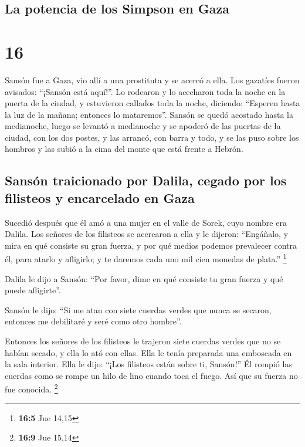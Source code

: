 \hypertarget{la-potencia-de-los-simpson-en-gaza}{%
\subsection{La potencia de los Simpson en
Gaza}\label{la-potencia-de-los-simpson-en-gaza}}

\hypertarget{section-15}{%
\section{16}\label{section-15}}

 Sansón fue a Gaza, vio allí a una prostituta y se acercó
a ella.  Los gazatíes fueron avisados: ``¡Sansón está
aquí!''. Lo rodearon y lo acecharon toda la noche en la puerta de la
ciudad, y estuvieron callados toda la noche, diciendo: ``Esperen hasta
la luz de la mañana; entonces lo mataremos''.  Sansón se
quedó acostado hasta la medianoche, luego se levantó a medianoche y se
apoderó de las puertas de la ciudad, con los dos postes, y las arrancó,
con barra y todo, y se las puso sobre los hombros y las subió a la cima
del monte que está frente a Hebrón.

\hypertarget{sansuxf3n-traicionado-por-dalila-cegado-por-los-filisteos-y-encarcelado-en-gaza}{%
\subsection{Sansón traicionado por Dalila, cegado por los filisteos y
encarcelado en
Gaza}\label{sansuxf3n-traicionado-por-dalila-cegado-por-los-filisteos-y-encarcelado-en-gaza}}

 Sucedió después que él amó a una mujer en el valle de
Sorek, cuyo nombre era Dalila.  Los señores de los
filisteos se acercaron a ella y le dijeron: ``Engáñalo, y mira en qué
consiste su gran fuerza, y por qué medios podemos prevalecer contra él,
para atarlo y afligirlo; y te daremos cada uno mil cien monedas de
plata.'' \footnote{\textbf{16:5} Jue 14,15}

 Dalila le dijo a Sansón: ``Por favor, dime en qué
consiste tu gran fuerza y qué puede afligirte''.

 Sansón le dijo: ``Si me atan con siete cuerdas verdes que
nunca se secaron, entonces me debilitaré y seré como otro hombre''.

 Entonces los señores de los filisteos le trajeron siete
cuerdas verdes que no se habían secado, y ella lo ató con ellas.
 Ella le tenía preparada una emboscada en la sala
interior. Ella le dijo: ``¡Los filisteos están sobre ti, Sansón!'' Él
rompió las cuerdas como se rompe un hilo de lino cuando toca el fuego.
Así que su fuerza no fue conocida. \footnote{\textbf{16:9} Jue 15,14}

